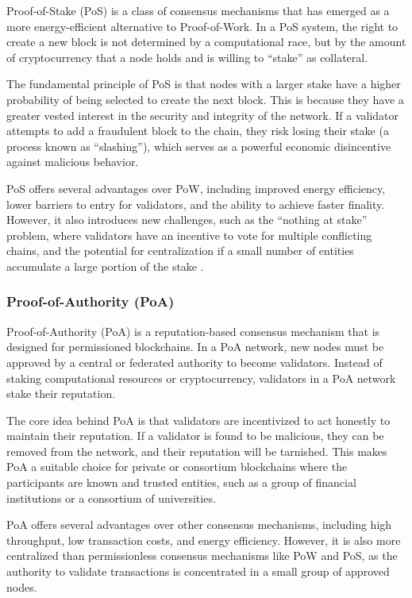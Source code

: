 Proof-of-Stake (PoS) is a class of consensus mechanisms that has emerged
as a more energy-efficient alternative to Proof-of-Work. In a PoS
system, the right to create a new block is not determined by a
computational race, but by the amount of cryptocurrency that a node
holds and is willing to ``stake'' as collateral.

The fundamental principle of PoS is that nodes with a larger stake have
a higher probability of being selected to create the next block. This is
because they have a greater vested interest in the security and
integrity of the network. If a validator attempts to add a fraudulent
block to the chain, they risk losing their stake (a process known as
``slashing''), which serves as a powerful economic disincentive against
malicious behavior.

PoS offers several advantages over PoW, including improved energy
efficiency, lower barriers to entry for validators, and the ability to
achieve faster finality. However, it also introduces new challenges,
such as the ``nothing at stake'' problem, where validators have an
incentive to vote for multiple conflicting chains, and the potential for
centralization if a small number of entities accumulate a large portion
of the stake .

\subsubsection{Proof-of-Authority
	(PoA)}\label{proof-of-authority-poa}

Proof-of-Authority (PoA) is a reputation-based consensus mechanism that
is designed for permissioned blockchains. In a PoA network, new nodes
must be approved by a central or federated authority to become
validators. Instead of staking computational resources or
cryptocurrency, validators in a PoA network stake their reputation.

The core idea behind PoA is that validators are incentivized to act
honestly to maintain their reputation. If a validator is found to be
malicious, they can be removed from the network, and their reputation
will be tarnished. This makes PoA a suitable choice for private or
consortium blockchains where the participants are known and trusted
entities, such as a group of financial institutions or a consortium of
universities.

PoA offers several advantages over other consensus mechanisms, including
high throughput, low transaction costs, and energy efficiency. However,
it is also more centralized than permissionless consensus mechanisms
like PoW and PoS, as the authority to validate transactions is
concentrated in a small group of approved nodes.

